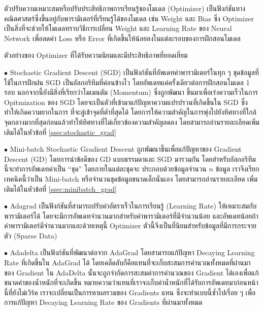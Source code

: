 ตัวปรับความเหมาะสมหรือปรับประสิทธิภาพการเรียนรู้ของโมเดล (Optimizer) เป็นฟังก์ชันทางคณิตศาสตร์ซึ่งขึ้นอยู่กับพารามิเตอร์ที่เรียนรู้ได้ของโมเดล 
เช่น Weight และ Bias ซึ่ง Optimizer เป็นสิ่งที่จะช่วยให้โมเดลทราบวิธีการเปลี่ยน Weight และ Learning Rate ของ Neural Network 
เพื่อลดค่า Loss หรือ Error ที่เกิดขึ้นให้น้อยลงในแต่ละรอบของการฝึกสอนโมเดล

\noindent ตัวอย่างของ Optimizer ที่ได้รับความนิยมและมีประสิทธิภาพที่ยอดเยี่ยม

\noindent $\bullet$ Stochastic Gradient Descent (SGD) เป็นฟังก์ชันที่อัพเดทค่าพารามิเตอร์ในทุก ๆ ชุดข้อมูลที่ใช้ในการฝึกฝน SGD 
เป็นอัลกอริทึมที่ค่อนข้างไว โดยอัพเดทแค่ครั้งเดียวต่อการฝึกสอนโมเดล 1 รอบ นอกจากนี้ยังมีสิ่งที่เรียกว่าโมเมนตัม (Momentum) ซึ่งถูกพัฒนา%
ขึ้นมาเพื่อเร่งความเร็วในการ Opitmization ของ SGD โดยจะเป็นตัวที่เข้ามาแก้ปัญหาความแปรปรวนที่เกิดขึ้นใน SGD ซึ่งทำให้เกิดความยากในการ%
ที่จะลู่เข้าจุดที่ต่ำที่สุดได้ โดยการให้ความสำคัญในการพุ่งไปยังทิศทางที่ใกล้จุดกลางมากที่สุดก่อนแล้วทำให้ทิศทางที่ไม่เกี่ยวข้องความสำคัญลดลง
โดยสามารถอ่านรายละเอียดเพิ่มเติมได้ในหัวข้อที่ \ref{ssec:stochastic_grad}

\noindent $\bullet$ Mini-batch Stochastic Gradient Descent ถูกพัฒนาขึ้นเพื่อแก้ปัญหาของ Gradient Descent (GD) 
โดยการนำข้อดีของ GD แบบธรรมดาและ SGD มารวมกัน โดยสำหรับอัลกอริทึมนี้จะทำการอัพเดทค่าเป็น \enquote{ชุด} โดยภายในแต่ละชุดจะ%
ประกอบด้วยข้อมูลจำนวน $n$ ข้อมูล เราจึงเรียกเทคนิคนี้ว่าเป็น Mini-batch หรือจำนวนชุดข้อมูลขนาดเล็กนั่นเอง โดยสามารถอ่านรายละเอียด%
เพิ่มเติมได้ในหัวข้อที่ \ref{ssec:minibatch_grad}

\noindent $\bullet$ Adagrad เป็นฟังก์ชันที่สามารถปรับค่าอัตราเร็วในการเรียนรู้ (Learning Rate) ให้เหมาะสมกับพารามิเตอร์ได้ 
โดยจะมีการอัพเดทจำนวนมากสำหรับค่าพารามิเตอร์ที่มีจำนวนน้อย และอัพเดทน้อยถ้าค่าพารามิเตอร์มีจำนวนมากและด้วยเหตุนี้ Optimizer 
ตัวนี้จึงเป็นที่นิยมสำหรับข้อมูลที่มีการกระจายตัว (Sparse Data)

\noindent $\bullet$ Adadelta เป็นฟังก์ชันที่พัฒนาต่อจาก AdaGrad โดยสามารถแก้ปัญหา Decaying Learning Rate ที่เกิดขึ้นใน 
AdaGrad ได้ โดยเคล็ดลับก็คือแทนที่จะเก็บสะสมการคำนวณทั้งหมดที่ผ่านมาของ Gradient ใน AdaDelta นั้นจะถูกจำกัดการสะสมค่าการคำนวณของ 
Gradient ได้เองเพื่อแก้ขนาดค่าของน้ำหนักที่จะเกิดขึ้น หมายความว่าแทนที่เราจะเก็บค่าน้ำหนักที่ได้รับการอัพเดทมาก่อนหน้านี้ที่ยังไม่เวิร์ค 
เราจะเปลี่ยนเป็นการหาผลรวมของ Gradients แทน ซึ่งจะทำแบบนี้ซ้ำไปเรื่อย ๆ เพื่อการแก้ปัญหา Decaying Learning Rate ของ Gradients 
ที่ผ่านมาทั้งหมด


